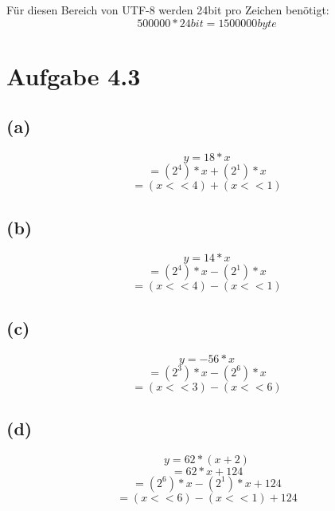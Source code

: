 \documentclass[12pt]{article}
\begin{document}
Für diesen Bereich von UTF-8 werden 24bit pro Zeichen benötigt:
\[500000 * 24bit = 1500000byte\]

\section{Aufgabe 4.3}
\subsection{(a)}
\[y = 18 * x\]
\[= (2^4) * x + (2^1) * x\]
\[= (x << 4) + (x << 1)\]
\subsection{(b)}
\[y = 14 * x\]
\[= (2^4) * x - (2^1) * x\]
\[= (x << 4) - (x << 1)\]
\subsection{(c)}
\[y = -56 * x\]
\[= (2^3) * x - (2^6) * x\]
\[= (x << 3) - (x << 6)\]
\subsection{(d)}
\[y = 62 * (x + 2)\]
\[= 62 * x + 124\]
\[= (2^6) * x - (2^1) * x + 124\]
\[= (x << 6) - (x << 1) + 124\]
\end{document}
